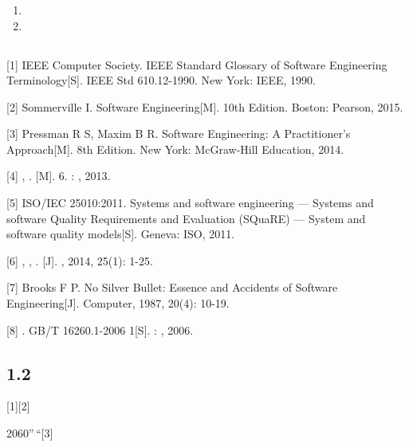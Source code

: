 \hypertarget{section-12}{%
\subsubsection{}\label{section-12}}

\begin{enumerate}
\def\labelenumi{\arabic{enumi}.}
\tightlist
\item
\item
\end{enumerate}

\hypertarget{section-13}{%
\subsection{}\label{section-13}}

\hypertarget{section-14}{%
\subsection{}\label{section-14}}

{[}1{]} IEEE Computer Society. IEEE Standard Glossary of Software
Engineering Terminology{[}S{]}. IEEE Std 610.12-1990. New York: IEEE,
1990.

{[}2{]} Sommerville I. Software Engineering{[}M{]}. 10th Edition.
Boston: Pearson, 2015.

{[}3{]} Pressman R S, Maxim B R. Software Engineering: A Practitioner's
Approach{[}M{]}. 8th Edition. New York: McGraw-Hill Education, 2014.

{[}4{]} , . {[}M{]}. 6. : , 2013.

{[}5{]} ISO/IEC 25010:2011. Systems and software engineering --- Systems
and software Quality Requirements and Evaluation (SQuaRE) --- System and
software quality models{[}S{]}. Geneva: ISO, 2011.

{[}6{]} , , . {[}J{]}. , 2014, 25(1): 1-25.

{[}7{]} Brooks F P. No Silver Bullet: Essence and Accidents of Software
Engineering{[}J{]}. Computer, 1987, 20(4): 10-19.

{[}8{]} . GB/T 16260.1-2006 1{[}S{]}. : , 2006.

\hypertarget{section-15}{%
\subsection{1.2}\label{section-15}}

{[}1{]}{[}2{]}

2060''\,``{[}3{]}

